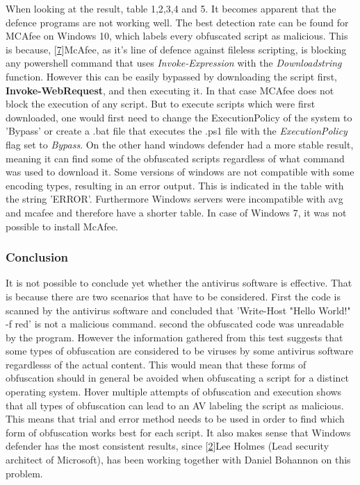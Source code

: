 \documentclass{article}%
\begin{document}
When looking at the result, table 1,2,3,4 and 5. It becomes apparent that the defence programs are not working well. The best detection rate can be found for MCAfee on Windows 10, which labels every obfuscated script as malicious. This is because, [\hyperlink{7}{7}]McAfee, as it's line of defence against fileless scripting, is blocking any powershell command that uses \textit{Invoke-Expression} with the \textit{Downloadstring} function. However this can be easily bypassed by downloading the script first, \textbf{Invoke-WebRequest}, and then executing it. In that case MCAfee does not block the execution of any script. But to execute scripts which were first downloaded, one would first need to change the ExecutionPolicy of the system to 'Bypass' or create a .bat file that executes the .ps1 file with the \textit{ExecutionPolicy} flag set to \textit{Bypass}. On the other hand windows defender had a more stable result, meaning it can find some of the obfuscated scripts regardless of what command was used to download it. Some versions of windows are not compatible with some encoding types, resulting in an error output. This is indicated in the table with the string 'ERROR'. Furthermore Windows servers were incompatible with avg and mcafee and therefore have a shorter table. In case of Windows 7, it was not possible to install McAfee.
\subsubsection{Conclusion}
It is not possible to conclude yet whether the antivirus software is effective. That is because there are two scenarios that have to be considered. First the code is scanned by the antivirus software and concluded that 'Write-Host "Hello World!" -f red' is not a malicious command. second the obfuscated code was unreadable by the program. However the information gathered from this test suggests that some types of obfuscation are considered to be viruses by some antivirus software regardlesss of the actual content. This would mean that these forms of obfuscation should in general be avoided when obfuscating a script for a distinct operating system. Hover multiple attempts of obfuscation and execution shows that all types of obfuscation can lead to an AV labeling the script as malicious. This means that trial and error method needs to be used in order to find which form of obfuscation works best for each script. It also makes sense that Windows defender has the most consistent results, since [\hyperlink{2}{2}]Lee Holmes (Lead security architect of Microsoft), has been working together with Daniel Bohannon on this problem.
\end{document}
